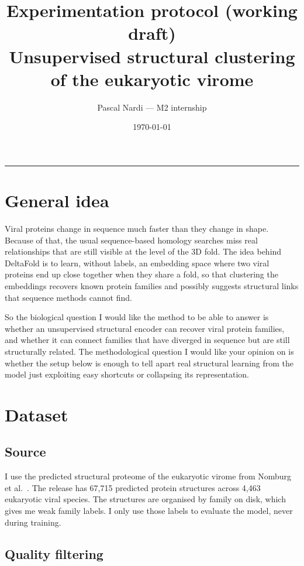 \documentclass[11pt,a4paper]{article}
\title{Experimentation protocol (working draft)\\[2pt]
\large Unsupervised structural clustering of the eukaryotic virome}
\author{Pascal Nardi --- M2 internship}
\date{\today}
\theoremstyle{definition}
\begin{document}
\maketitle

\tableofcontents
\vspace{4pt}
\hrule

\section{General idea}

Viral proteins change in sequence much faster than they change in shape. Because
of that, the usual sequence-based homology searches miss real relationships that
are still visible at the level of the 3D fold. The idea behind DeltaFold is to
learn, without labels, an embedding space where two viral proteins end up close
together when they share a fold, so that clustering the embeddings recovers known
protein families and possibly suggests structural links that sequence methods
cannot find.

So the biological question I would like the method to be able to answer is
whether an unsupervised structural encoder can recover viral protein families,
and whether it can connect families that have diverged in sequence but are still
structurally related. The methodological question I would like your opinion on is
whether the setup below is enough to tell apart real structural learning from the
model just exploiting easy shortcuts or collapsing its representation.

\section{Dataset}

\subsection{Source}

I use the predicted structural proteome of the eukaryotic virome from Nomburg et
al.~\cite{nomburg2024}. The release has 67,715 predicted protein structures
across 4,463 eukaryotic viral species. The structures are organised by family on
disk, which gives me weak family labels. I only use those labels to evaluate the
model, never during training.

\subsection{Quality filtering}
\end{document}
